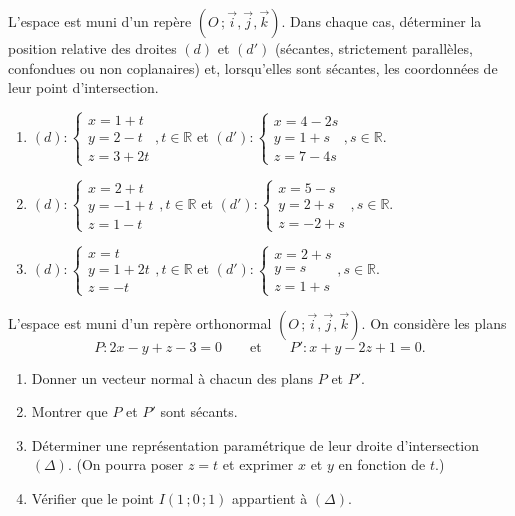 \documentclass[11pt]{article}
\newcounter{popsec}
\newcounter{popsub}
\newcommand{\courssub}[1]{%
  \stepcounter{popsub}%
  \par\vspace{9pt}\noindent{\popxbold\fontsize{11.5}{13}\selectfont\color{popink}{\color{poporange}\thepopsec.\thepopsub}\hspace{6pt}#1}\par\nopagebreak\vspace{4pt}
}
\begin{document}
\courssub{Je m'entraîne}

\begin{exercice}
L'espace est muni d'un repère $(O\,;\vec{i},\vec{j},\vec{k})$. Dans chaque cas, déterminer la position relative des droites $(d)$ et $(d')$ (sécantes, strictement parallèles, confondues ou non coplanaires) et, lorsqu'elles sont sécantes, les coordonnées de leur point d'intersection.
\begin{enumerate}
\item $(d) : \begin{cases} x = 1 + t \\ y = 2 - t \\ z = 3 + 2t \end{cases}, t \in \mathbb{R}$ \quad et \quad $(d') : \begin{cases} x = 4 - 2s \\ y = 1 + s \\ z = 7 - 4s \end{cases}, s \in \mathbb{R}$.
\item $(d) : \begin{cases} x = 2 + t \\ y = -1 + t \\ z = 1 - t \end{cases}, t \in \mathbb{R}$ \quad et \quad $(d') : \begin{cases} x = 5 - s \\ y = 2 + s \\ z = -2 + s \end{cases}, s \in \mathbb{R}$.
\item $(d) : \begin{cases} x = t \\ y = 1 + 2t \\ z = -t \end{cases}, t \in \mathbb{R}$ \quad et \quad $(d') : \begin{cases} x = 2 + s \\ y = s \\ z = 1 + s \end{cases}, s \in \mathbb{R}$.
\end{enumerate}
\end{exercice}

\begin{exercice}
L'espace est muni d'un repère orthonormal $(O\,;\vec{i},\vec{j},\vec{k})$. On considère les plans
\[ P : 2x - y + z - 3 = 0 \qquad \text{et} \qquad P' : x + y - 2z + 1 = 0. \]
\begin{enumerate}
\item Donner un vecteur normal à chacun des plans $P$ et $P'$.
\item Montrer que $P$ et $P'$ sont sécants.
\item Déterminer une représentation paramétrique de leur droite d'intersection $(\Delta)$. (On pourra poser $z = t$ et exprimer $x$ et $y$ en fonction de $t$.)
\item Vérifier que le point $I(1\,;0\,;1)$ appartient à $(\Delta)$.
\end{enumerate}
\end{exercice}
\end{document}
